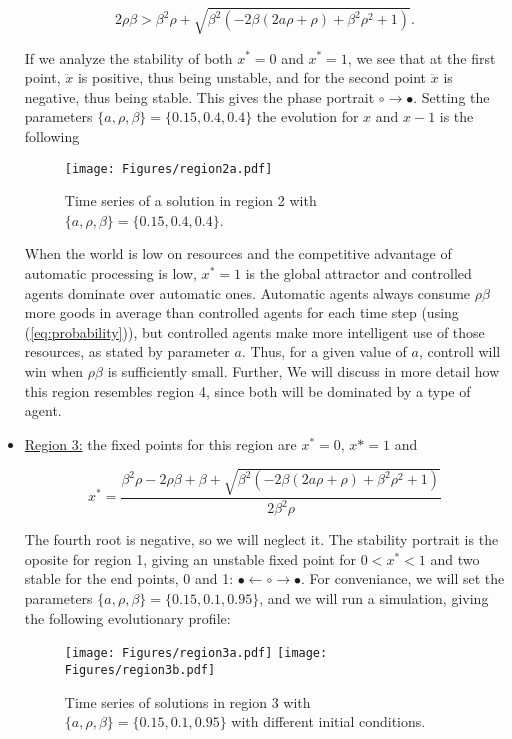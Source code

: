 \documentclass[10pt,a4paper]{article}
\begin{document}
\begin{itemize}
{	$$2\rho\beta > \beta^2\rho + \sqrt{\beta^2 (-2\beta(2a\rho+\rho)+\beta^2\rho^2+1)}.$$
 
 If we analyze the stability of both $x^*=0$ and $x^*=1$, we see that at the first point, $\ddot{x}$ is positive, thus being unstable, and for the second point
 $\ddot{x}$ is negative, thus being stable. This gives the phase portrait $\circ\rightarrow\bullet$. Setting the parameters $\{a,\rho,\beta\}=\{0.15,0.4,0.4\}$ 
 the evolution for $x$ and $x-1$ is the following
 
\begin{figure}[h!]
\centering
\vspace{-1.5cm}
\texttt{[image: Figures/region2a.pdf]}
\vspace{-0.4cm}
\caption{Time series of a solution in region 2 with  $\{a,\rho,\beta\}=\{0.15,0.4,0.4\}$.}
\end{figure}
 
 When the world is low on resources and the competitive advantage of automatic processing is low, $x^*=1$ is the global attractor and controlled agents 
 dominate over automatic ones. Automatic agents always consume $\rho\beta$ more goods in average than controlled agents for each time step 
 (using (\ref{eq:probability})), but controlled agents make more intelligent use of those resources, as stated by parameter $a$. Thus, for a given value of $a$,
 controll will win when $\rho\beta$ is sufficiently small. Further, We will discuss in more detail how this region resembles region 4, since both will be dominated
 by a type of agent.
 }
 
 \item {\underline{Region 3:} the fixed points for this region are $x^*=0$, $x*=1$ and 
 
$$ x^*= \frac{\beta^2\rho - 2\rho\beta + \beta + \sqrt{\beta^2 (-2\beta(2a\rho+\rho)+\beta^2\rho^2+1)}}{2\beta^2\rho}$$
 
 The fourth root is negative, so we will neglect it. The stability portrait is the oposite for region 1, giving an unstable fixed point for $0<x^*<1$ and two 
 stable for the end points, 0 and 1: $\bullet\leftarrow\circ\rightarrow\bullet$. For conveniance, we will set the parameters $\{a,\rho,\beta\}=\{0.15,0.1,0.95\}$, 
 and we will run a simulation, giving the following evolutionary profile:
 
\begin{figure}[h!]
\centering
\vspace{-1.5cm}
\texttt{[image: Figures/region3a.pdf]}
\texttt{[image: Figures/region3b.pdf]}
\vspace{-0.4cm}
\caption{Time series of solutions in region 3 with  $\{a,\rho,\beta\}=\{0.15,0.1,0.95\}$ with different initial conditions.}
\end{figure}
 
}
\end{itemize}
\end{document}
